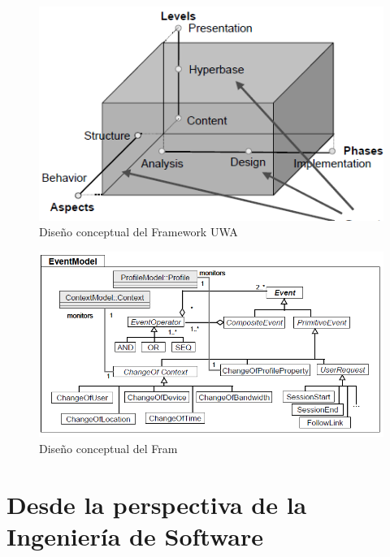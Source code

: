 \begin{figure}[t]
\begin{center}
 \includegraphics[width=5 in,totalheight=3 in]
{Ch1/Figuras/ScopeCustomisation.png}
\caption{Dise\~no conceptual del Framework UWA}\label{uwaFramework}
\end{center}
\end{figure}


\begin{figure}[t]
\begin{center}
 \includegraphics[width=4 in,totalheight=3 in]
{Ch1/Figuras/UWAEventModel.png}
\caption{Dise\~no conceptual del Fram}\label{uwaFramework}
\end{center}
\end{figure}



\section{Desde la perspectiva de la Ingeniería de Software}
 
